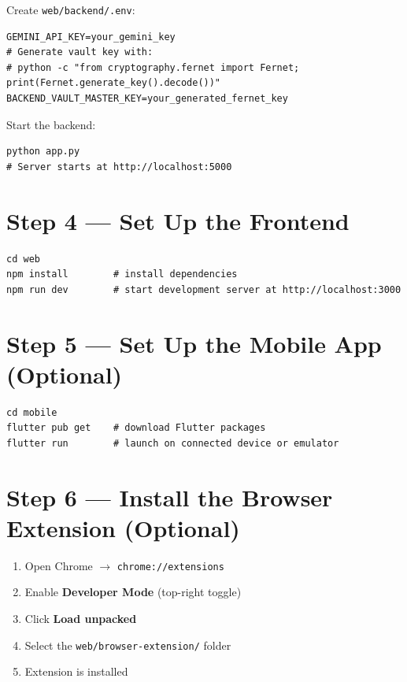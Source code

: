 \documentclass[12pt, a4paper]{report}
\newcommand{\code}[1]{\texttt{\small #1}}
\newcommand{\filepath}[1]{\texttt{\small\color{ccpurpledk}#1}}
\begin{document}
Create \filepath{web/backend/.env}:

\begin{lstlisting}[style=envstyle]
GEMINI_API_KEY=your_gemini_key
# Generate vault key with:
# python -c "from cryptography.fernet import Fernet; print(Fernet.generate_key().decode())"
BACKEND_VAULT_MASTER_KEY=your_generated_fernet_key
\end{lstlisting}

Start the backend:

\begin{lstlisting}[style=bashstyle]
python app.py
# Server starts at http://localhost:5000
\end{lstlisting}

\section{Step 4 --- Set Up the Frontend}

\begin{lstlisting}[style=bashstyle]
cd web
npm install        # install dependencies
npm run dev        # start development server at http://localhost:3000
\end{lstlisting}

\section{Step 5 --- Set Up the Mobile App (Optional)}

\begin{lstlisting}[style=bashstyle]
cd mobile
flutter pub get    # download Flutter packages
flutter run        # launch on connected device or emulator
\end{lstlisting}

\section{Step 6 --- Install the Browser Extension (Optional)}

\begin{enumerate}
  \item Open Chrome $\to$ \code{chrome://extensions}
  \item Enable \textbf{Developer Mode} (top-right toggle)
  \item Click \textbf{Load unpacked}
  \item Select the \filepath{web/browser-extension/} folder
  \item Extension is installed
\end{enumerate}
\end{document}
